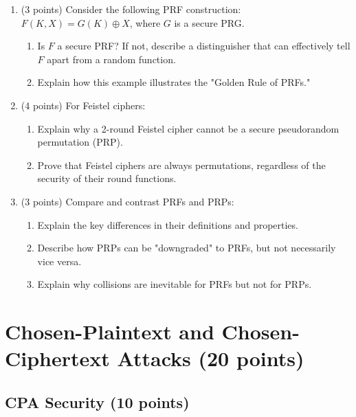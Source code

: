 \documentclass[10pt,a4paper,american]{article}
\begin{document}
\begin{enumerate}
	\item (3 points) Consider the following PRF construction: $F(K, X) = G(K) \oplus X$, where $G$ is a secure PRG.
	      \begin{enumerate}
		      \item Is $F$ a secure PRF? If not, describe a distinguisher that can effectively tell $F$ apart from a random function.
		      \item Explain how this example illustrates the "Golden Rule of PRFs."
	      \end{enumerate}

	\item (4 points) For Feistel ciphers:
	      \begin{enumerate}
		      \item Explain why a 2-round Feistel cipher cannot be a secure pseudorandom permutation (PRP).
		      \item Prove that Feistel ciphers are always permutations, regardless of the security of their round functions.
	      \end{enumerate}

	\item (3 points) Compare and contrast PRFs and PRPs:
	      \begin{enumerate}
		      \item Explain the key differences in their definitions and properties.
		      \item Describe how PRPs can be "downgraded" to PRFs, but not necessarily vice versa.
		      \item Explain why collisions are inevitable for PRFs but not for PRPs.
	      \end{enumerate}
\end{enumerate}

\section{Chosen-Plaintext and Chosen-Ciphertext Attacks (20 points)}

\subsection{CPA Security (10 points)}
\end{document}
